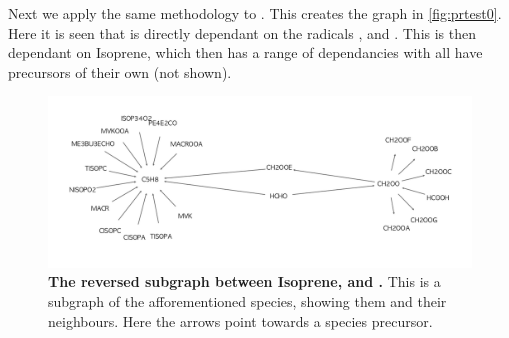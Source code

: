 Next we apply the same methodology to . This creates the graph in \autoref{fig:prtest0}. Here it is seen that  is directly dependant on the radicals , and . This is then dependant on Isoprene, which then has a range of dependancies with all have precursors of their own (not shown). 


\begin{figure}[H]
  \centering
  \includegraphics[width=\textwidth]{figures_c3/prtest0.png}

  \label{fig:prtest0}

\caption{\textbf{The reversed subgraph between Isoprene,  and .} This is a subgraph of the afforementioned species, showing them and their neighbours. Here the arrows point towards a species precursor. }
\end{figure}

